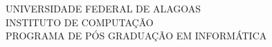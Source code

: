 \begin{capa}
	\center
	UNIVERSIDADE FEDERAL DE ALAGOAS\\
	INSTITUTO DE COMPUTAÇÃO\\
	PROGRAMA DE PÓS GRADUAÇÃO EM INFORMÁTICA

	\vfill
	\MakeUppercase{\imprimirautor}

    \vfill
    \textbf{\imprimirtitulo}
    \vfill
    
    \vfill
    \imprimirlocal
    \par
    \imprimirdata

    \vspace*{1cm}
\end{capa}
